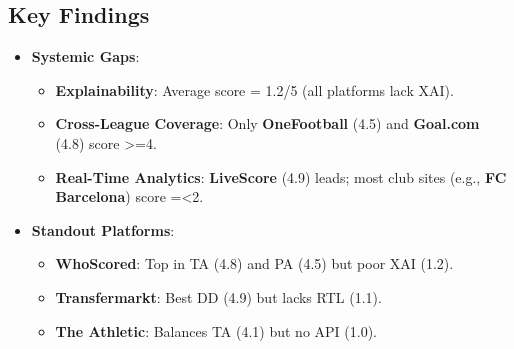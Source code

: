 \subsection{Key Findings}
\begin{itemize}
    \item \textbf{Systemic Gaps}:  
    \begin{itemize}
        \item \textbf{Explainability}: Average score = 1.2/5 (all platforms lack XAI).
        \item \textbf{Cross-League Coverage}: Only \textbf{OneFootball} (4.5) and \textbf{Goal.com} (4.8) score >=4.
        \item \textbf{Real-Time Analytics}: \textbf{LiveScore} (4.9) leads; most club sites (e.g., \textbf{FC Barcelona}) score =<2.
    \end{itemize}
    
    \item \textbf{Standout Platforms}:  
    \begin{itemize}
        \item \textbf{WhoScored}: Top in TA (4.8) and PA (4.5) but poor XAI (1.2).
        \item \textbf{Transfermarkt}: Best DD (4.9) but lacks RTL (1.1).
        \item \textbf{The Athletic}: Balances TA (4.1) but no API (1.0).
    \end{itemize}
\end{itemize}

